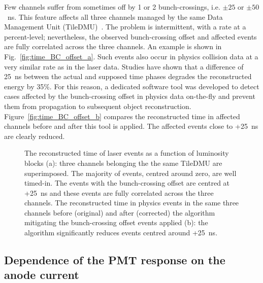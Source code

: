 Few channels suffer from {\tlaser} sometimes off by 1 or 2
bunch-crossings, i.e. $\pm25$ or $\pm50$~ns. This feature
affects all three channels managed by the same Data Management Unit
(TileDMU)~\cite{Berglund:2008zz}. The problem is intermittent, with a 
rate at a percent-level; nevertheless, the observed
bunch-crossing offset and affected events are fully correlated across
the three channels. An example is shown in Fig.~\ref{fig:time_BC_offset_a}.
%
Such events also occur in physics collision data at a very similar
rate as in the laser data. Studies have shown that a difference of
25~ns between the actual and supposed time phases degrades the
reconstructed energy by 35\%. For this reason, a dedicated software
tool was developed to detect cases affected by the bunch-crossing
offset in physics data on-the-fly and prevent them from propagation to
subsequent object reconstruction. Figure~\ref{fig:time_BC_offset_b} compares the reconstructed time in affected channels before and
after this tool is applied. The affected events close to +25~ns
are clearly reduced.  

\begin{figure}[htbp]
\centering
    \caption{The reconstructed time of laser events as a function of
    luminosity blocks (a): three channels belonging the the same
    TileDMU are superimposed. The majority of events, centred around zero, are well
    timed-in. The events with the bunch-crossing offset are centred at
    +25~ns and these events are fully correlated across the
    three channels. The reconstructed time in physics events in
    the same three channels before (original) and after (corrected)
    the algorithm mitigating the bunch-crossing offset events
    applied (b): the algorithm significantly reduces events centred around
    +25~ns.}
    \label{fig:time_BC_offset}
\end{figure}

\subsection{Dependence of the PMT response on the anode current}

